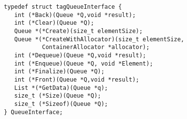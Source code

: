 \begin{verbatim}
typedef struct tagQueueInterface {
   int (*Back)(Queue *Q,void *result);
   int (*Clear)(Queue *Q);
   Queue *(*Create)(size_t elementSize);
   Queue *(*CreateWithAllocator)(size_t elementSize,
           ContainerAllocator *allocator);
   int (*Dequeue)(Queue *Q,void *result);
   int (*Enqueue)(Queue *Q, void *Element);
   int (*Finalize)(Queue *Q);
   int (*Front)(Queue *Q,void *result);
   List *(*GetData)(Queue *q);
   size_t (*Size)(Queue *Q);
   size_t (*Sizeof)(Queue *Q);
} QueueInterface;
\end{verbatim}
